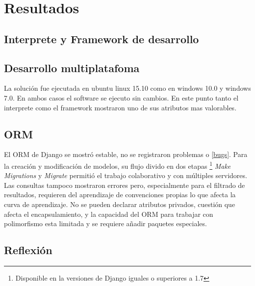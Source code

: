 \documentclass[twoside,twocolumn]{article}
\begin{document}
\section{Resultados}
\label{sec:resultados}


\subsection{Interprete y Framework de desarrollo}

\subsection{Desarrollo multiplatafoma}
La solución fue ejecutada en ubuntu linux 15.10 como en windows 10.0 y windows 7.0. En ambos casos el software se ejecuto sin cambios. En este punto tanto el interprete como el framework mostraron uno de sus atributos mas valorables.


\subsection{ORM}
El ORM de Django se mostró estable, no se registraron problemas o \ref{bugs}. Para la creación y modificación de modelos, su flujo divido en dos etapas \footnote{Disponible en la versiones de Django iguales o superiores a 1.7} \textit{Make Migrations} y \textit{Migrate} permitió el trabajo colaborativo y con múltiples servidores. Las consultas tampoco mostraron errores pero, especialmente para el filtrado de resultados, requieren del aprendizaje de convenciones propias lo que afecta la curva de aprendizaje. No se pueden declarar atributos privados, cuestión que afecta el encapsulamiento, y la capacidad del ORM para trabajar con polimorfismo esta limitada y se requiere añadir paquetes especiales.

\subsection{Reflexión}



\end{document}

